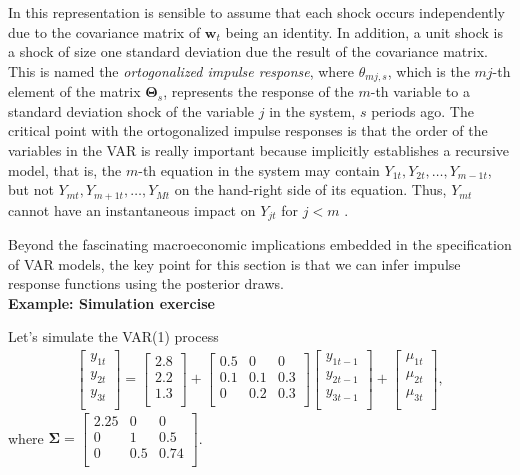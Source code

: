 In this representation is sensible to assume that each shock occurs independently due to the covariance matrix of $\bm{w}_t$ being an identity. In addition, a unit shock is a shock of size one standard deviation due the result of the covariance matrix. This is named the \textit{ortogonalized impulse response}, where $\theta_{mj,s}$, which is the $mj$-th element of the matrix $\bm{\Theta}_s$, represents the response of the $m$-th variable to a standard deviation shock of the variable $j$ in the system, $s$ periods ago. The critical point with the ortogonalized impulse responses is that the order of the variables in the VAR is really important because implicitly establishes a recursive model, that is, the $m$-th equation in the system may contain $Y_{1t}, Y_{2t}, \dots, Y_{m-1t}$, but not $Y_{mt}, Y_{m+1t}, \dots, Y_{Mt}$ on the hand-right side of its equation. Thus, $Y_{mt}$ cannot have an instantaneous impact on $Y_{jt}$ for $j<m$ \cite[Chap.~2]{helmut2005new}.

Beyond the fascinating macroeconomic implications embedded in the specification of VAR models, the key point for this section is that we can infer impulse response functions using the posterior draws.\\

\textbf{Example: Simulation exercise}

Let's simulate the VAR(1) process
\begin{align*}
	\begin{bmatrix}
		y_{1t}\\
		y_{2t}\\
		y_{3t}\\
	\end{bmatrix} = \begin{bmatrix}
	2.8\\
	2.2\\
	1.3\\
\end{bmatrix} + \begin{bmatrix}
0.5 & 0 & 0\\
0.1 & 0.1 & 0.3\\
0 & 0.2 & 0.3\\
\end{bmatrix} \begin{bmatrix}
y_{1t-1}\\
y_{2t-1}\\
y_{3t-1}\\
\end{bmatrix} +\begin{bmatrix}
\mu_{1t}\\
\mu_{2t}\\
\mu_{3t}\\
\end{bmatrix},
\end{align*}
where $\bm{\Sigma}= \begin{bmatrix}
	2.25 & 0 & 0\\
	0 & 1 & 0.5\\
	0 & 0.5 & 0.74\\
\end{bmatrix}$.

